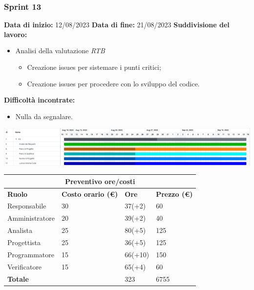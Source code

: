 \documentclass[a4paper, 12pt]{article}
\begin{document}
\subsubsection{Sprint 13}
\textbf{Data di inizio:} 12/08/2023\newline
\textbf{Data di fine:} 21/08/2023\newline
\newline
\textbf{Suddivisione del lavoro:}
\begin{itemize}
	\item Analisi della valutazione \textit{RTB}
	      \begin{itemize}
		      \item Creazione issues per sistemare i punti critici;
		      \item Creazione issues per procedere con lo sviluppo del codice.
	      \end{itemize}
\end{itemize}
\textbf{Difficoltà incontrate:}
\begin{itemize}
	\item Nulla da segnalare.
\end{itemize}
\includegraphics[scale=0.178]{PB_1.png}\newline
\newline
\begin{center}
	\begin{tabularx}{\textwidth}{|X|X|X|X|}
		\hline
		\multicolumn{4}{|c|}{\textbf{Preventivo ore/costi}}                                      \\
		\hline
		\hline
		\textbf{Ruolo}  & \textbf{Costo orario (\euro)} & \textbf{Ore} & \textbf{Prezzo (\euro)} \\
		\hline
		Responsabile    & 30                            & 37(+2)       & 60                      \\
		\hline
		Amministratore  & 20                            & 39(+2)       & 40                      \\
		\hline
		Analista        & 25                            & 80(+5)       & 125                     \\
		\hline
		Progettista     & 25                            & 36(+5)       & 125                     \\
		\hline
		Programmatore   & 15                            & 66(+10)      & 150                     \\
		\hline
		Verificatore    & 15                            & 65(+4)       & 60                      \\
		\hline
		\hline
		\textbf{Totale} &                               & 323          & 6755                    \\
		\hline
	\end{tabularx}\\[8pt]
	\mbox{}\\
\end{center}
\end{document}

